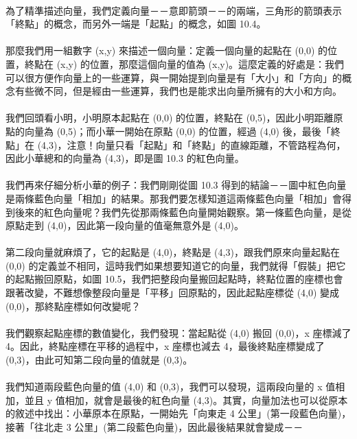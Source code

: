\documentclass[12pt,a4paper,oneside]{report}
\begin{document}
\begin{CJK}{UTF8}{bkai}
\paragraph{}為了精準描述向量，我們定義向量－－意即箭頭－－的兩端，三角形的箭頭表示「終點」的概念，而另外一端是「起點」的概念，如圖 10.4。
\paragraph{}那麼我們用一組數字 (x,y) 來描述一個向量：定義一個向量的起點在 (0,0) 的位置，終點在 (x,y) 的位置，那麼這個向量的值為 (x,y)。這麼定義的好處是：我們可以很方便作向量上的一些運算，與一開始提到向量是有「大小」和「方向」的概念有些微不同，但是經由一些運算，我們也是能求出向量所擁有的大小和方向。
\paragraph{}我們回頭看小明，小明原本起點在 (0,0) 的位置，終點在 (0,5)，因此小明距離原點的向量為 (0,5)；而小華一開始在原點 (0,0) 的位置，經過 (4,0) 後，最後「終點」在 (4,3)，注意！向量只看「起點」和「終點」的直線距離，不管路程為何，因此小華總和的向量為 (4,3)，即是圖 10.3 的紅色向量。
\paragraph{}我們再來仔細分析小華的例子：我們剛剛從圖 10.3 得到的結論－－圖中紅色向量是兩條藍色向量「相加」的結果。那我們要怎樣知道這兩條藍色向量「相加」會得到後來的紅色向量呢？我們先從那兩條藍色向量開始觀察。第一條藍色向量，是從原點走到 (4,0)，因此第一段向量的值毫無意外是 (4,0)。
\paragraph{}第二段向量就麻煩了，它的起點是 (4,0)，終點是 (4,3)，跟我們原來向量起點在 (0,0) 的定義並不相同，這時我們如果想要知道它的向量，我們就得「假裝」把它的起點搬回原點，如圖 10.5，我們把整段向量搬回起點時，終點位置的座標也會跟著改變，不難想像整段向量是「平移」回原點的，因此起點座標從 (4,0) 變成 (0,0)，那終點座標如何改變呢？
\paragraph{}我們觀察起點座標的數值變化，我們發現：當起點從 (4,0) 搬回 (0,0)，x 座標減了 4。因此，終點座標在平移的過程中，x 座標也減去 4，最後終點座標變成了 (0,3)，由此可知第二段向量的值就是 (0,3)。
\paragraph{}我們知道兩段藍色向量的值 (4,0) 和 (0,3)，我們可以發現，這兩段向量的 x 值相加，並且 y 值相加，就會是最後的紅色向量 (4,3)。其實，向量加法也可以從原本的敘述中找出：小華原本在原點，一開始先「向東走 4 公里」(第一段藍色向量)，接著「往北走 3 公里」(第二段藍色向量)，因此最後結果就會變成－－

\end{CJK}
\end{document}
